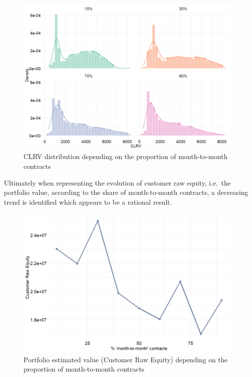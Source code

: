\documentclass[
]{book}
\begin{document}
\begin{figure}

{\centering \includegraphics[width=13.89in]{./imgs/clrv_month_to_month} 

}

\caption{CLRV distribution depending on the proportion of month-to-month contracts}\label{fig:clrvmonthtomonth}
\end{figure}

Ultimately when representing the evolution of customer raw equity, i.e.~the portfolio value, according to the share of month-to-month contracts, a decreasing trend is identified which appears to be a rational result.

\begin{figure}

{\centering \includegraphics[width=12.5in]{./imgs/portVal_month_to_month} 

}

\caption{Portfolio estimated value (Customer Raw Equity) depending on the proportion of month-to-month contracts}\label{fig:clrvmonthtomonthEvol}
\end{figure}
\end{document}
